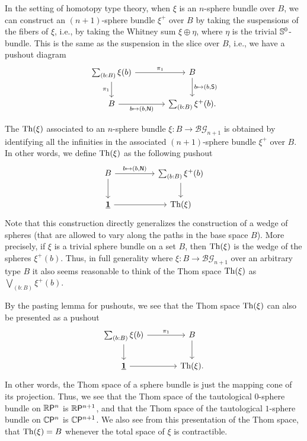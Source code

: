 \documentclass[reqno]{amsart}
\begin{document}
In the setting of homotopy type theory, when $\xi$ is an $n$-sphere bundle over
$B$, we can construct an $(n+1)$-sphere
bundle $\xi^+$ over $B$ by taking the suspensions of the fibers of $\xi$,
i.e., by taking the Whitney sum $\xi\oplus \eta$, where $\eta$ is the trivial
$\mathbb{S}^{0}$-bundle.
This is the same as the suspension
in the slice over $B$, i.e., we have a pushout diagram
\begin{equation*}
\begin{tikzcd}[column sep=large]
\sm{b:B}\xi(b) \arrow[d,swap,"\pi_1"] \arrow[r,"\pi_1"] & B \arrow[d,"b\mapsto\pairr{b,\south}"] \\
B \arrow[r,swap,"b\mapsto\pairr{b,\north}"] & \sm{b:B}\xi^+(b).
\end{tikzcd}
\end{equation*}

The  $\mathrm{Th}(\xi)$ associated to an $n$-sphere bundle $\xi:B\to\mathcal{BG}_{n+1}$
is obtained by identifying all the infinities in the associated $(n+1)$-sphere bundle $\xi^+$ over $B$.
In other words, we define $\mathrm{Th}(\xi)$ as the following pushout
\begin{equation*}
\begin{tikzcd}[column sep=huge]
B \arrow[d] \arrow[r,"b\mapsto\pairr{b,\north}"] & \sm{b:B}\xi^+(b) \arrow[d] \\
\unit \arrow[r] & \Thom(\xi)
\end{tikzcd}
\end{equation*}
Note that this construction directly generalizes the construction of a wedge
of spheres (that are allowed to vary along the paths in the base space $B$).
More precisely, if $\xi$ is a trivial sphere bundle on a set $B$, then $\mathrm{Th}(\xi)$
is the wedge of the spheres $\xi^+(b)$.
Thus, in full generality where $\xi:B\to\mathcal{BG}_{n+1}$ over an arbitrary type $B$ it also seems reasonable to think of the Thom space $\mathrm{Th}(\xi)$ as $\bigvee_{(b:B)}\xi^+(b)$. 

By the pasting lemma for pushouts, we see that the Thom space $\mathrm{Th}(\xi)$ can
also be presented as a pushout
\begin{equation*}
\begin{tikzcd}[column sep=large]
\sm{b:B}\xi(b) \arrow[d,swap] \arrow[r,"\pi_1"] & B \arrow[d] \\
\unit \arrow[r] & \Thom(\xi).
\end{tikzcd}
\end{equation*}
In other words, the Thom space of a sphere bundle is just the mapping cone of
its projection. Thus, we see that the Thom space of the tautological $0$-sphere
bundle on $\mathbb{R}\mathsf{P}^{n}$ is $\mathbb{R}\mathsf{P}^{n+1}$, and that the Thom space
of the tautological $1$-sphere bundle on $\mathbb{C}\mathsf{P}^{n}$ is $\mathbb{C}\mathsf{P}^{n+1}$.
We also see from this presentation of the Thom space, that $\mathrm{Th}(\xi)=B$ whenever
the total space of $\xi$ is contractible.
\end{document}
